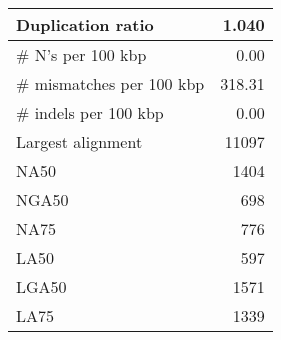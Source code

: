 \documentclass[12pt,a4paper]{article}
\begin{document}
\begin{table}[ht]
\begin{center}
\begin{tabular}{|l*{1}{|r}|}
Duplication ratio & 1.040 \\ \hline
\# N's per 100 kbp & 0.00 \\ \hline
\# mismatches per 100 kbp & 318.31 \\ \hline
\# indels per 100 kbp & 0.00 \\ \hline
Largest alignment & 11097 \\ \hline
NA50 & 1404 \\ \hline
NGA50 & 698 \\ \hline
NA75 & 776 \\ \hline
LA50 & 597 \\ \hline
LGA50 & 1571 \\ \hline
LA75 & 1339 \\ \hline
\end{tabular}
\end{center}
\end{table}
\end{document}
